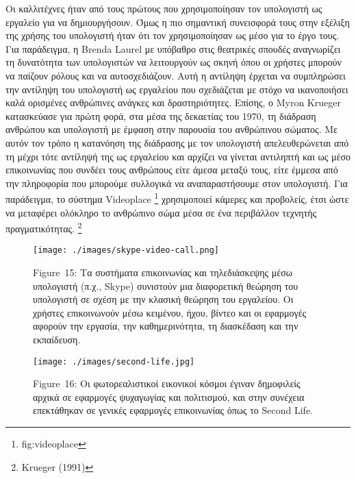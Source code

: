 \documentclass[
]{article}
\begin{document}
Οι καλλιτέχνες ήταν από τους πρώτους που χρησιμοποίησαν τον υπολογιστή
ως εργαλείο για να δημιουργήσουν. Όμως η πιο σημαντική συνεισφορά τους
στην εξέλιξη της χρήσης του υπολογιστή ήταν ότι τον χρησιμοποίησαν ως
μέσο για το έργο τους. Για παράδειγμα, η Brenda Laurel με υπόβαθρο στις
θεατρικές σπουδές αναγνωρίζει τη δυνατότητα των υπολογιστών να
λειτουργούν ως σκηνή όπου οι χρήστες μπορούν να παίζουν ρόλους και να
αυτοσχεδιάζουν. Αυτή η αντίληψη έρχεται να συμπληρώσει την αντίληψη του
υπολογιστή ως εργαλείου που σχεδιάζεται με στόχο να ικανοποιήσει καλά
ορισμένες ανθρώπινες ανάγκες και δραστηριότητες. Επίσης, ο Myron Krueger
κατασκεύασε για πρώτη φορά, στα μέσα της δεκαετίας του 1970, τη διάδραση
ανθρώπου και υπολογιστή με έμφαση στην παρουσία του ανθρώπινου σώματος.
Με αυτόν τον τρόπο η κατανόηση της διάδρασης με τον υπολογιστή
απελευθερώνεται από τη μέχρι τότε αντίληψή της ως εργαλείου και αρχίζει
να γίνεται αντιληπτή και ως μέσο επικοινωνίας που συνδέει τους ανθρώπους
είτε άμεσα μεταξύ τους, είτε έμμεσα από την πληροφορία που μπορούμε
συλλογικά να αναπαραστήσουμε στον υπολογιστή. Για παράδειγμα, το σύστημα
Videoplace \footnote{fig:videoplace} χρησιμοποιεί κάμερες και προβολείς,
έτσι ώστε να μεταφέρει ολόκληρο το ανθρώπινο σώμα μέσα σε ένα περιβάλλον
τεχνητής πραγματικότητας. \footnote{Krueger (1991)}

\leavevmode{}%
\begin{figure}
\hypertarget{fig:skype-video-call}{%
\centering
\texttt{[image: ./images/skype-video-call.png]}
\caption{Figure~15: Τα συστήματα επικοινωνίας και τηλεδιάσκεψης μέσω
υπολογιστή (π.χ., Skype) συνιστούν μια διαφορετική θεώρηση του
υπολογιστή σε σχέση με την κλασική θεώρηση του εργαλείου. Οι χρήστες
επικοινωνούν μέσω κειμένου, ήχου, βίντεο και οι εφαρμογές αφορούν την
εργασία, την καθημερινότητα, τη διασκέδαση και την
εκπαίδευση.}\label{fig:skype-video-call}
}
\end{figure}

\leavevmode{}%
\begin{figure}
\hypertarget{fig:second-life}{%
\centering
\texttt{[image: ./images/second-life.jpg]}
\caption{Figure~16: Οι φωτορεαλιστικοί εικονικοί κόσμοι έγιναν
δημοφιλείς αρχικά σε εφαρμογές ψυχαγωγίας και πολιτισμού, και στην
συνέχεια επεκτάθηκαν σε γενικές εφαρμογές επικοινωνίας όπως το Second
Life.}\label{fig:second-life}
}
\end{figure}
\end{document}
